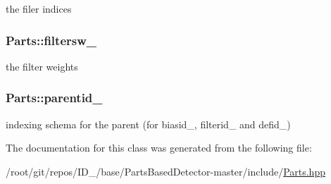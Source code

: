 the filer indices 

\hypertarget{classParts_a1de4d2cb595176d37aae609acbce88d8}{
\subsubsection[{filtersw\-\_\-}]{ {\bf \-Parts\-::filtersw\-\_\-}}}\label{classParts_a1de4d2cb595176d37aae609acbce88d8}


the filter weights 

\hypertarget{classParts_ad74222c286ee6ee93659109a6d1d625f}{
\subsubsection[{parentid\-\_\-}]{ {\bf \-Parts\-::parentid\-\_\-}}}\label{classParts_ad74222c286ee6ee93659109a6d1d625f}


indexing schema for the parent (for biasid\-\_\-, filterid\-\_\- and defid\-\_\-) 



\-The documentation for this class was generated from the following file\-:\begin{DoxyCompactItemize}
\item 
/root/git/repos/\-I\-D\-\_/base/\-Parts\-Based\-Detector-\/master/include/\hyperlink{Parts_8hpp}{\-Parts.\-hpp}\end{DoxyCompactItemize}

